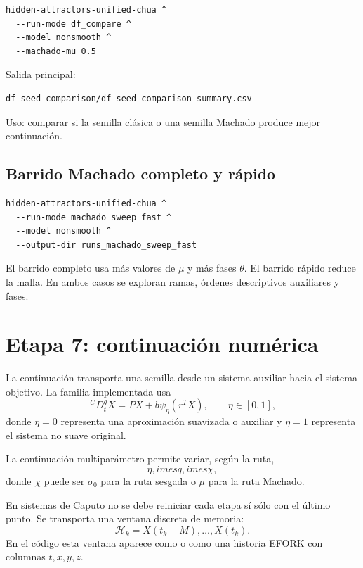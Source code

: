 \documentclass[11pt]{article}
\newcommand{\code}[1]{\path{#1}}
\newcommand{\CaputoD}{\,{}^{C}D_t^q}
\begin{document}
\begin{lstlisting}
hidden-attractors-unified-chua ^
  --run-mode df_compare ^
  --model nonsmooth ^
  --machado-mu 0.5
\end{lstlisting}

Salida principal:
\begin{lstlisting}
df_seed_comparison/df_seed_comparison_summary.csv
\end{lstlisting}

Uso: comparar si la semilla clásica o una semilla Machado produce mejor continuación.

\subsection{Barrido Machado completo y rápido}

\begin{lstlisting}
hidden-attractors-unified-chua ^
  --run-mode machado_sweep_fast ^
  --model nonsmooth ^
  --output-dir runs_machado_sweep_fast
\end{lstlisting}

El barrido completo usa más valores de \(\mu\) y más fases \(\theta\). El barrido rápido reduce la malla. En ambos casos se exploran ramas, órdenes descriptivos auxiliares y fases.

\section{Etapa 7: continuación numérica}

La continuación transporta una semilla desde un sistema auxiliar hacia el sistema objetivo. La familia implementada usa
\begin{equation}
\CaputoD X=P X+b\psi_\eta(r^TX),
\qquad \eta\in[0,1],
\end{equation}
donde \(\eta=0\) representa una aproximación suavizada o auxiliar y \(\eta=1\) representa el sistema no suave original.

La continuación multiparámetro permite variar, según la ruta,
\begin{equation}
\eta,	imes q,	imes \chi,
\end{equation}
donde \(\chi\) puede ser \(\sigma_0\) para la ruta sesgada o \(\mu\) para la ruta Machado.

En sistemas de Caputo no se debe reiniciar cada etapa sí sólo con el último punto. Se transporta una ventana discreta de memoria:
\begin{equation}
\mathcal H_k=X(t_k-M),\ldots,X(t_k).
\end{equation}
En el código esta ventana aparece como \code{FractionalHistory} o como una historia EFORK con columnas \(t,x,y,z\).
\end{document}
